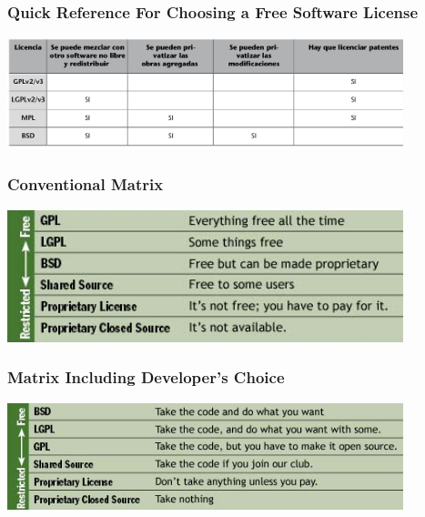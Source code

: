 
\begin{frame}
\frametitle{Quick Reference For Choosing a Free Software License}

\begin{center}
\includegraphics[width=11.5cm]{figs/tabla_licencias.png}
\end{center}

\end{frame}


\begin{frame}
\frametitle{Conventional Matrix}

\begin{center}
\includegraphics[width=11.5cm]{figs/conventional_matrix.png}
\end{center}

\end{frame}


\begin{frame}
\frametitle{Matrix Including Developer's Choice}

\begin{center}
\includegraphics[width=11.5cm]{figs/matrix_developers_choice.png}
\end{center}

\end{frame}


